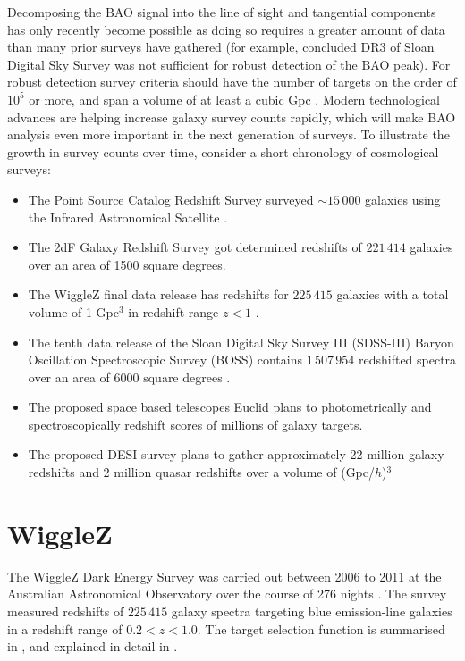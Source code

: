 \documentclass[titlesmallcaps, examinerscopy, copyrightpage]{uqthesis}
\begin{document}
Decomposing the BAO signal into the line of sight and tangential components has only recently become possible as doing so requires a greater amount of data than many prior surveys have gathered (for example, \citet{OkumuraMatsubara2008} concluded DR3 of Sloan Digital Sky Survey was not sufficient for robust detection of the BAO peak). For robust detection survey criteria should have the number of targets on the order of $10^5$ or more, and span a volume of at least a cubic Gpc \citep{Tegmark1997,BlakeGlazebrook2003,BlakeParkinson2006}. Modern technological advances are helping increase galaxy survey counts rapidly, which will make BAO analysis even more important in the next generation of surveys. To illustrate the growth in survey counts over time, consider a short chronology of cosmological surveys:
\begin{itemize}
\item The Point Source Catalog Redshift Survey surveyed $\sim 15\,000$ galaxies using the Infrared Astronomical Satellite \citep{SaundersSutherland2000}.
\item The 2dF Galaxy Redshift Survey got determined redshifts of $221\,414$ galaxies \citep{CollessPeterson2003} over an area of 1500 square degrees.
\item The WiggleZ final data release has redshifts for $225\,415$ galaxies with a total volume of 1 Gpc$^3$ in redshift range $z < 1$ \citep{Drinkwater2010, Parkinson2012}.
\item The tenth data release of the Sloan Digital Sky Survey III (SDSS-III) Baryon Oscillation Spectroscopic Survey (BOSS) contains $1\,507\,954$ redshifted spectra over an area of 6000 square degrees \citep{AhnAlexandroff2014}.
\item The proposed space based telescopes Euclid plans to photometrically and spectroscopically redshift scores of millions of galaxy targets\citep{CimattiRobberto2009,WangPercival2010}.
\item The proposed DESI survey plans to gather approximately 22 million galaxy redshifts and 2 million quasar redshifts over a volume of (Gpc/$h$)$^3$ \citep{LeviBebek2013}
\end{itemize}






\section{WiggleZ} \label{sec:wigglez}

The WiggleZ Dark Energy Survey was carried out between 2006 to 2011 at the Australian Astronomical Observatory over the course of 276 nights \citep{Drinkwater2010}. The survey measured redshifts of $225\,415$ galaxy spectra targeting blue emission-line galaxies in a redshift range of $0.2 < z < 1.0$. The target selection function is summarised in \citet{BlakeDavis2011}, and explained in detail in \citet{BlakeBrough2010}. \\
\end{document}

